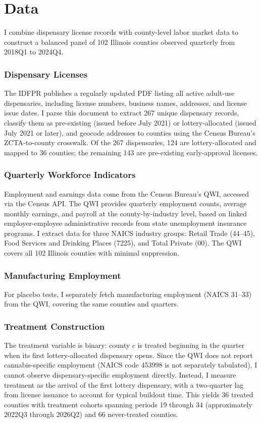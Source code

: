 \documentclass[12pt]{article}
\begin{document}
\section{Data}
\label{sec:data}

I combine dispensary license records with county-level labor market data to construct a balanced panel of 102 Illinois counties observed quarterly from 2018Q1 to 2024Q4.

\subsubsection*{Dispensary Licenses} The IDFPR publishes a regularly updated PDF listing all active adult-use dispensaries, including license numbers, business names, addresses, and license issue dates. I parse this document to extract 267 unique dispensary records, classify them as pre-existing (issued before July 2021) or lottery-allocated (issued July 2021 or later), and geocode addresses to counties using the Census Bureau's ZCTA-to-county crosswalk. Of the 267 dispensaries, 124 are lottery-allocated and mapped to 36 counties; the remaining 143 are pre-existing early-approval licenses.

\subsubsection*{Quarterly Workforce Indicators} Employment and earnings data come from the Census Bureau's QWI, accessed via the Census API. The QWI provides quarterly employment counts, average monthly earnings, and payroll at the county-by-industry level, based on linked employer-employee administrative records from state unemployment insurance programs. I extract data for three NAICS industry groups: Retail Trade (44--45), Food Services and Drinking Places (7225), and Total Private (00). The QWI covers all 102 Illinois counties with minimal suppression.

\subsubsection*{Manufacturing Employment} For placebo tests, I separately fetch manufacturing employment (NAICS 31--33) from the QWI, covering the same counties and quarters.

\subsubsection*{Treatment Construction} The treatment variable is binary: county $c$ is treated beginning in the quarter when its first lottery-allocated dispensary opens. Since the QWI does not report cannabis-specific employment (NAICS code 453998 is not separately tabulated), I cannot observe dispensary-specific employment directly. Instead, I measure treatment as the arrival of the first lottery dispensary, with a two-quarter lag from license issuance to account for typical buildout time. This yields 36 treated counties with treatment cohorts spanning periods 19 through 34 (approximately 2022Q3 through 2026Q2) and 66 never-treated counties.
\end{document}
